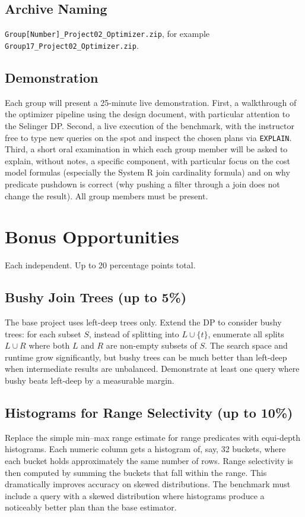 \documentclass[11pt,a4paper]{article}
\begin{document}
\subsection{Archive Naming}
\texttt{Group[Number]\_Project02\_Optimizer.zip}, for example \texttt{Group17\_Project02\_Optimizer.zip}.

\subsection{Demonstration}
Each group will present a 25-minute live demonstration. First, a walkthrough of the optimizer pipeline using the design document, with particular attention to the Selinger DP. Second, a live execution of the benchmark, with the instructor free to type new queries on the spot and inspect the chosen plans via \texttt{EXPLAIN}. Third, a short oral examination in which each group member will be asked to explain, without notes, a specific component, with particular focus on the cost model formulas (especially the System R join cardinality formula) and on why predicate pushdown is correct (why pushing a filter through a join does not change the result). All group members must be present.

\section{Bonus Opportunities}

Each independent. Up to 20 percentage points total.

\subsection{Bushy Join Trees (up to 5\%)}
The base project uses left-deep trees only. Extend the DP to consider bushy trees: for each subset $S$, instead of splitting into $L \cup \{t\}$, enumerate all splits $L \cup R$ where both $L$ and $R$ are non-empty subsets of $S$. The search space and runtime grow significantly, but bushy trees can be much better than left-deep when intermediate results are unbalanced. Demonstrate at least one query where bushy beats left-deep by a measurable margin.

\subsection{Histograms for Range Selectivity (up to 10\%)}
Replace the simple min--max range estimate for range predicates with equi-depth histograms. Each numeric column gets a histogram of, say, 32 buckets, where each bucket holds approximately the same number of rows. Range selectivity is then computed by summing the buckets that fall within the range. This dramatically improves accuracy on skewed distributions. The benchmark must include a query with a skewed distribution where histograms produce a noticeably better plan than the base estimator.
\end{document}
